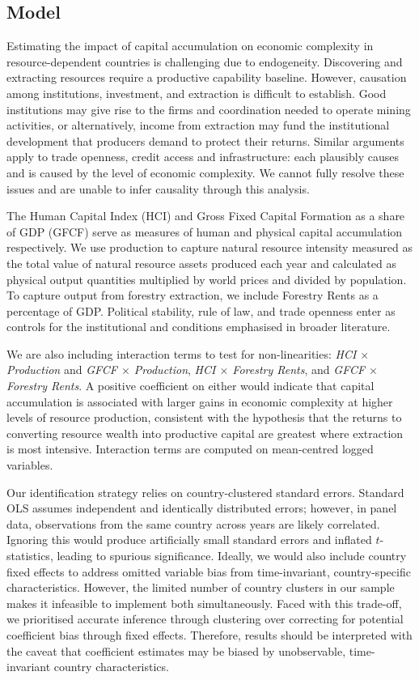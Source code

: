 \documentclass[12pt,a4paper]{report}
\begin{document}
\subsection{Model}

Estimating the impact of capital accumulation on economic complexity in resource-dependent countries is challenging due to endogeneity. Discovering and extracting resources require a productive capability baseline. However, causation among institutions, investment, and extraction is difficult to establish. Good institutions may give rise to the firms and coordination needed to operate mining activities, or alternatively, income from extraction may fund the institutional development that producers demand to protect their returns. Similar arguments apply to trade openness, credit access and infrastructure: each plausibly causes and is caused by the level of economic complexity. We cannot fully resolve these issues and are unable to infer causality through this analysis.

The Human Capital Index (HCI) and Gross Fixed Capital Formation as a share of GDP (GFCF) serve as measures of human and physical capital accumulation respectively. We use production to capture natural resource intensity measured as the total value of natural resource assets produced each year and calculated as physical output quantities multiplied by world prices and divided by population. To capture output from forestry extraction, we include Forestry Rents as a percentage of GDP. Political stability, rule of law, and trade openness enter as controls for the institutional and conditions emphasised in broader literature.

We are also including interaction terms to test for non-linearities: \textit{HCI $\times$ Production} and \textit{GFCF $\times$ Production}, \textit{HCI $\times$ Forestry Rents}, and \textit{GFCF $\times$ Forestry Rents}. A positive coefficient on either would indicate that capital accumulation is associated with larger gains in economic complexity at higher levels of resource production, consistent with the hypothesis that the returns to converting resource wealth into productive capital are greatest where extraction is most intensive. Interaction terms are computed on mean-centred logged variables.

Our identification strategy relies on country-clustered standard errors. Standard OLS assumes independent and identically distributed errors; however, in panel data, observations from the same country across years are likely correlated. Ignoring this would produce artificially small standard errors and inflated $t$-statistics, leading to spurious significance. Ideally, we would also include country fixed effects to address omitted variable bias from time-invariant, country-specific characteristics. However, the limited number of country clusters in our sample makes it infeasible to implement both simultaneously. Faced with this trade-off, we prioritised accurate inference through clustering over correcting for potential coefficient bias through fixed effects. Therefore, results should be interpreted with the caveat that coefficient estimates may be biased by unobservable, time-invariant country characteristics.
\end{document}
